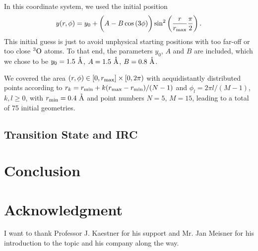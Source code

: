 \documentclass[8.5pt,twoside,twocolumn]{article}
\renewcommand{\Ang}{\mathring{\te{A}}}
\newcommand\tripo{\enmat{{^3\te{O}}}}
\theoremstyle{standard}
\begin{document}
In this coordinate system, we used the initial position
\begin{equation}
 y(r,\phi)=y_0+\left({\vphantom{\frac 1 2}  A-B\cos\left({3\phi}\right)}\right) \sin^2\left({\frac{r}{r_{\text{max}}}\frac\pi 2 }\right).
\end{equation}
This initial guess is
just to avoid unphysical starting positions with too far-off or too close $\tripo$
atoms. To that end, the parameters $y_0$, $A$ and $B$ are included, which we chose to be
$y_0=1.5~\Ang$, $A=1.5~\Ang$, $B=0.8~\Ang$.

We covered the area $(r,\phi) \in [0,r_{\text{max}}] \times [0, 2\pi)$ with aequidistantly
distributed points according to $r_k=r_{\text{min}}+k(r_{\text{max}}-r_{\text{min}})/(N-1)$ and $\phi_l=2\pi l/(M-1)$,
$k,l \geq 0$, with $\rmin=0.4~\Ang$ and point numbers $N=5$, $M=15$, leading
to a total of 75 initial geometries.  


\subsection{Transition State and IRC}
\label{Sec:Adv:IRC}

\newpage

\section{Conclusion}
\label{Sec:Con}

\section*{Acknowledgment}
I want to thank Professor J. Kaestner for his support and Mr. Jan Meisner for
his introduction to the topic and his company along the way.


% 

%
{}
\end{document}
